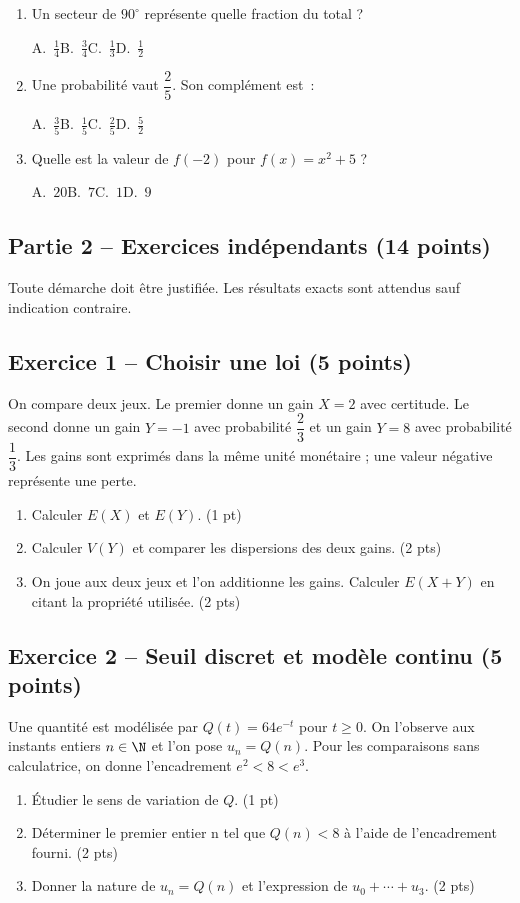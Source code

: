 \begin{enumerate}
\item Un secteur de $90^\circ$ représente quelle fraction du total ?\par A.~$\frac{1}{4}$\quad B.~$\frac{3}{4}$\quad C.~$\frac{1}{3}$\quad D.~$\frac{1}{2}$
\item Une probabilité vaut $\dfrac{2}{5}$. Son complément est~:\par A.~$\frac{3}{5}$\quad B.~$\frac{1}{5}$\quad C.~$\frac{2}{5}$\quad D.~$\frac{5}{2}$
\item Quelle est la valeur de $f(-2)$ pour $f(x)=x^2+5$ ?\par A.~$20$\quad B.~$7$\quad C.~$1$\quad D.~$9$
\end{enumerate}
\mxnewpage\subsection*{Partie 2 -- Exercices indépendants (14 points)}
Toute démarche doit être justifiée. Les résultats exacts sont attendus sauf indication contraire.
\subsection*{Exercice 1 -- Choisir une loi (5 points)}
On compare deux jeux. Le premier donne un gain $X=2$ avec certitude. Le second donne un gain $Y=-1$ avec probabilité $\dfrac23$ et un gain $Y=8$ avec probabilité $\dfrac13$. Les gains sont exprimés dans la même unité monétaire ; une valeur négative représente une perte.
\begin{enumerate}
\item Calculer $E(X)$ et $E(Y)$. \hfill(1 pt)
\item Calculer $V(Y)$ et comparer les dispersions des deux gains. \hfill(2 pts)
\item On joue aux deux jeux et l’on additionne les gains. Calculer $E(X+Y)$ en citant la propriété utilisée. \hfill(2 pts)
\end{enumerate}
\subsection*{Exercice 2 -- Seuil discret et modèle continu (5 points)}
Une quantité est modélisée par $Q(t)=64e^{-t}$ pour $t\geq0$. On l’observe aux instants entiers $n\in\N$ et l’on pose $u_n=Q(n)$. Pour les comparaisons sans calculatrice, on donne l’encadrement $e^2<8<e^3$.
\begin{enumerate}
\item Étudier le sens de variation de $Q$. \hfill(1 pt)
\item Déterminer le premier entier n tel que $Q(n)<8$ à l’aide de l’encadrement fourni. \hfill(2 pts)
\item Donner la nature de $u_n=Q(n)$ et l’expression de $u_0+\cdots+u_3$. \hfill(2 pts)
\end{enumerate}
